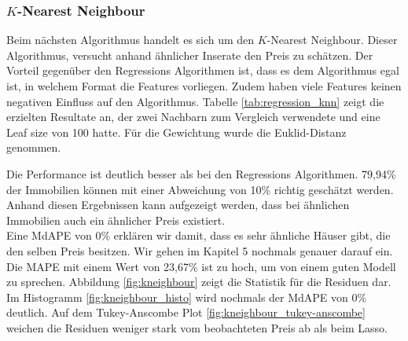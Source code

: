 \subsubsection{$K$-Nearest Neighbour}
Beim nächsten Algorithmus handelt es sich um den $K$-Nearest Neighbour. Dieser Algorithmus, versucht anhand ähnlicher Inserate den Preis zu schätzen. Der Vorteil gegenüber den Regressions Algorithmen ist, dass es dem Algorithmus egal ist, in welchem Format die Features vorliegen. Zudem haben viele Features keinen negativen Einfluss auf den Algorithmus.
Tabelle \ref{tab:regression_knn} zeigt die erzielten Resultate an, der zwei Nachbarn zum Vergleich verwendete und eine Leaf size von 100 hatte. Für die Gewichtung wurde die Euklid-Distanz genommen.

\begin{table}[ht]
\centering
{}
\caption{Ergebnisse von $K$-Nearest Neighbour}
\label{tab:regression_knn}
\end{table}

Die Performance ist deutlich besser als bei den Regressions Algorithmen. 79,94\% der Immobilien können mit einer Abweichung von 10\% richtig geschätzt werden. Anhand diesen Ergebnissen kann aufgezeigt werden, dass bei ähnlichen Immobilien auch ein ähnlicher Preis existiert.\\
Eine MdAPE von 0\% erklären wir damit, dass es sehr ähnliche Häuser gibt, die den selben Preis besitzen. Wir gehen im Kapitel 5 nochmals genauer darauf ein. Die MAPE mit einem Wert von 23,67\% ist zu hoch, um von einem guten Modell zu sprechen. Abbildung \ref{fig:kneighbour} zeigt die Statistik für die Residuen dar. Im Histogramm \ref{fig:kneighbour_histo} wird nochmals der MdAPE von 0\% deutlich. Auf dem Tukey-Anscombe Plot \ref{fig:kneighbour_tukey-anscombe} weichen die Residuen weniger stark vom beobachteten Preis ab als beim Lasso.

